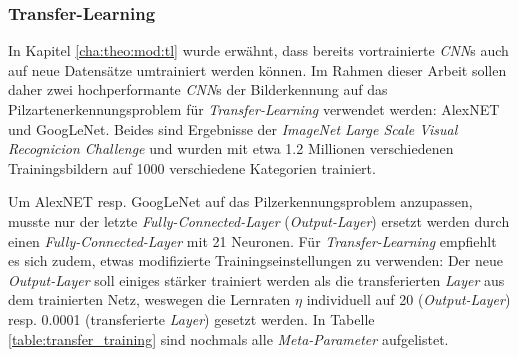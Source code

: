 \subsubsection{Transfer-Learning}\label{cha:met:tl}
In Kapitel \ref{cha:theo:mod:tl} wurde erwähnt, dass bereits vortrainierte \textit{CNN}s auch auf neue Datensätze umtrainiert werden können. Im Rahmen dieser Arbeit sollen daher zwei hochperformante \textit{CNN}s der Bilderkennung auf das Pilzartenerkennungsproblem für \textit{Transfer-Learning} verwendet werden: AlexNET\cite{alexnet} und GoogLeNet\cite{googlenet}. Beides sind Ergebnisse der \textit{ImageNet Large Scale Visual Recognicion Challenge}\cite{ilsvrc} und wurden mit etwa 1.2 Millionen verschiedenen Trainingsbildern auf 1000 verschiedene Kategorien trainiert.

Um AlexNET resp. GoogLeNet auf das Pilzerkennungsproblem anzupassen, musste nur der letzte \textit{Fully-Connected-Layer} (\textit{Output-Layer}) ersetzt werden durch einen \textit{Fully-Connected-Layer} mit 21 Neuronen. Für \textit{Transfer-Learning} empfiehlt es sich zudem, etwas modifizierte Trainingseinstellungen zu verwenden: Der neue \textit{Output-Layer} soll einiges stärker trainiert werden als die transferierten \textit{Layer} aus dem trainierten Netz, weswegen die Lernraten $\eta$ individuell auf 20 (\textit{Output-Layer}) resp. 0.0001 (transferierte \textit{Layer}) gesetzt werden. In Tabelle \ref{table:transfer_training} sind nochmals alle \textit{Meta-Parameter} aufgelistet.

